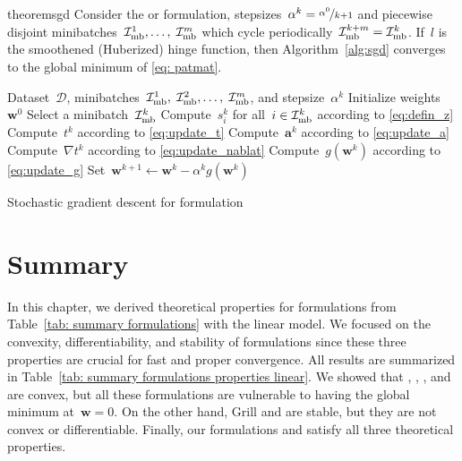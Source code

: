 \begin{restatable}{theorem}{sgd}\label{thm:sgd}
  Consider the \PatMat or \PatMatNP formulation, stepsizes~$\alpha^k = \nicefrac{\alpha^0}{k+1}$ and piecewise disjoint minibatches~$\mathcal{I}_{\text{mb}}^1, \ldots, \; \mathcal{I}_{\text{mb}}^m$ which cycle periodically~$\mathcal{I}_{\text{mb}}^{k+m} = \mathcal{I}_{\text{mb}}^k$. If~$l$ is the smoothened (Huberized) hinge function, then Algorithm~\ref{alg:sgd} converges to the global minimum of \eqref{eq: patmat}.
\end{restatable}

\begin{algorithm}
  \begin{algorithmic}[1]
    \Require Dataset~$\mathcal{D}$, minibatches~$\mathcal{I}_{\text{mb}}^1,\; \mathcal{I}_{\text{mb}}^2, \ldots, \; \mathcal{I}_{\text{mb}}^m$, and stepsize~$\alpha^k$
    \State Initialize weights~$\bm{w}^0$
    \State Select a minibatch~$\mathcal{I}_{\text{mb}}^k$
    \State Compute~$s_i^k$ for all~$i \in \mathcal{I}_{\text{mb}}^k$ according to \eqref{eq:defin_z}
    \State Compute~$t^k$ according to \eqref{eq:update_t}
    \State Compute~$\bm{a}^k$ according to \eqref{eq:update_a}
    \State Compute~$\nabla t^k$ according to \eqref{eq:update_nablat}
    \State Compute~$g(\bm{w}^k)$ according to \eqref{eq:update_g}
    \State Set~$\bm{w}^{k+1} \gets \bm{w}^k - \alpha^k g(\bm{w}^k)$
    \EndFor
  \end{algorithmic}
  \caption{Stochastic gradient descent for \PatMat formulation}
  \label{alg:sgd}
\end{algorithm}

\pagebreak

\section{Summary}

In this chapter, we derived theoretical properties for formulations from Table~\ref{tab: summary formulations} with the linear model. We focused on the convexity, differentiability, and stability of formulations since these three properties are crucial for fast and proper convergence. All results are summarized in Table~\ref{tab: summary formulations properties linear}. We showed that \TopPush, \TopPushK, \TopMeanK, and \tauFPL are convex, but all these formulations are vulnerable to having the global minimum at~$\bm{w}=0$. On the other hand, Grill and \GrillNP are stable, but they are not convex or differentiable. Finally, our formulations \PatMat and \PatMatNP satisfy all three theoretical properties. 

